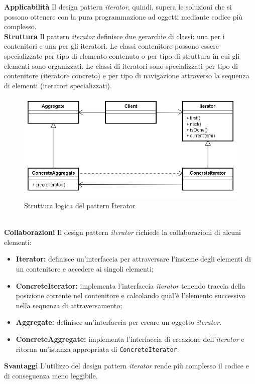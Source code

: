 \textbf{Applicabilità}	Il design pattern \textit{iterator}, quindi, supera le soluzioni che si possono ottenere con la pura programmazione ad oggetti mediante codice più complesso.
\\
\textbf{Struttura}	Il pattern \textit{iterator} definisce due gerarchie di classi: una per i contenitori e una per gli iteratori. Le classi contenitore possono essere specializzate per tipo di elemento contenuto o per tipo di struttura in cui gli elementi sono organizzati. Le classi di iteratori sono specializzati per tipo di contenitore (iteratore concreto) e per tipo di navigazione attraverso la sequenza di elementi (iteratori specializzati).
\\
\label{Struttura logica del pattern Iterator}
\begin{figure}
	\centering
	\includegraphics[scale=0.45]{UML/strutturaPattern/Iterator.png}
	\caption{Struttura logica del pattern Iterator}
\end{figure}
\\
\textbf{Collaborazioni}	Il design pattern \textit{iterator} richiede la collaborazioni di alcuni elementi:
	\begin{itemize}
		\item \textbf{Iterator:} definisce un'interfaccia per attraversare l'insieme degli elementi di un contenitore e accedere ai singoli elementi;
		\item \textbf{ConcreteIterator:} implementa l'interfaccia \textit{iterator} tenendo traccia della posizione corrente nel contenitore e calcolando qual'è l'elemento successivo nella sequenza di attraversamento;
		\item \textbf{Aggregate:} definisce un'interfaccia per creare un oggetto \textit{iterator}.
		\item \textbf{ConcreteAggregate:} implementa l'interfaccia di creazione dell'\textit{iterator} e ritorna un'istanza appropriata di \texttt{ConcreteIterator}.
	\end{itemize}
\textbf{Svantaggi}	L'utilizzo del design pattern \textit{iterator} rende più complesso il codice e di conseguenza meno leggibile.


